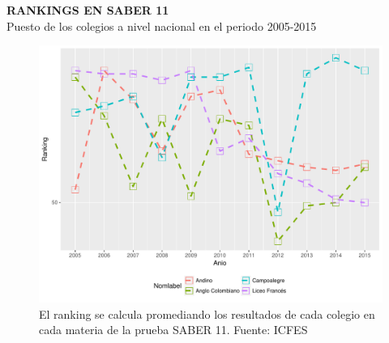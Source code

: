 \documentclass[letterpaper, 12pt]{book}\usepackage[]{graphicx}\usepackage[]{color}
\newenvironment{knitrout}{}{} %
\begin{document}
\newpage
\begin{center}
{\bf\Huge{RANKINGS EN SABER 11}}\\
\vspace{0.1cm}
 Puesto de los colegios a nivel nacional en el periodo 2005-2015
\end{center}
\vspace{2cm}
\begin{center}
\begin{knitrout}
\color{fgcolor}\begin{figure}[H]
\includegraphics[width=.9\linewidth]{figure/rankings-1} \caption[El ranking se calcula promediando los resultados de cada colegio en cada materia de la prueba SABER 11]{El ranking se calcula promediando los resultados de cada colegio en cada materia de la prueba SABER 11. Fuente: ICFES}\label{fig:rankings}
\end{figure}


\end{knitrout}
\end{center}
\end{document}
